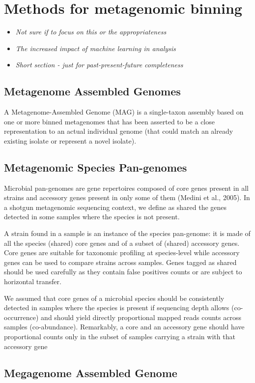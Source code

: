 \documentclass{article}
\begin{document}
\section{Methods for metagenomic binning}
\begin{itemize}
	\item \emph{Not sure if to focus on this or the appropriateness}
	\item \emph{The increased impact of machine learning in analysis}
	\item \emph{Short section - just for past-present-future completeness}
\end{itemize}
\subsection{Metagenome Assembled Genomes}
A Metagenome-Assembled Genome (MAG) is a single-taxon assembly based on one or more binned metagenomes that has been asserted to be a close representation to an actual individual genome (that could match an already existing isolate or represent a novel isolate).

\subsection{Metagenomic Species Pan-genomes}
Microbial pan-genomes are gene repertoires composed of core genes present in all strains and accessory genes present in only some of them (Medini et al., 2005). In a shotgun metagenomic sequencing context, we define as shared the genes detected in some samples where the species is not present.

A strain found in a sample is an instance of the species pan-genome: it is made of all the species (shared) core genes and of a subset of (shared) accessory genes. Core genes are suitable for taxonomic profiling at species-level while accessory genes can be used to compare strains across samples. Genes tagged as shared should be used carefully as they contain false positives counts or are subject to horizontal transfer.

We assumed that core genes of a microbial species should be consistently detected in samples where the species is present if sequencing depth allows (co-occurrence) and should yield directly proportional mapped reads counts across samples (co-abundance). Remarkably, a core and an accessory gene should have proportional counts only in the subset of samples carrying a strain with that accessory gene
\subsection{Megagenome Assembled Genome}
\end{document}
